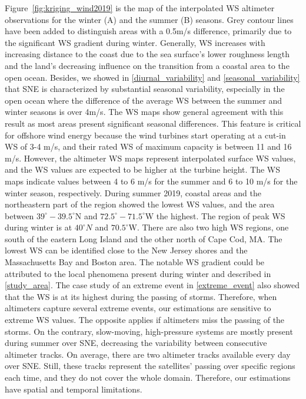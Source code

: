 Figure~\ref{fig:kriging_wind2019} is the map of the interpolated WS altimeter observations for the winter (A) and the summer (B) seasons. Grey contour lines have been added to distinguish areas with a 0.5m/s difference, primarily due to the significant WS gradient during winter. Generally, WS increases with increasing distance to the coast due to the sea surface's lower roughness length and the land's decreasing influence on the transition from a coastal area to the open ocean. Besides, we showed in \ref{diurnal_variability} and \ref{seasonal_variability} that SNE is characterized by substantial seasonal variability, especially in the open ocean where the difference of the average WS between the summer and winter seasons is over 4m/s. The WS maps show general agreement with this result as most areas present significant seasonal differences. This feature is critical for offshore wind energy because the wind turbines start operating at a cut-in WS of 3-4 m/s, and their rated WS of maximum capacity is between 11 and 16 m/s. However, the altimeter WS maps represent interpolated surface WS values, and the WS values are expected to be higher at the turbine height. The WS maps indicate values between 4 to 6 m/s for the summer and 6 to 10 m/s for the winter season, respectively. During summer 2019, coastal areas and the northeastern part of the region showed the lowest WS values, and the area between $39^{\circ}-39.5^{\circ}$N and $72.5^{\circ}-71.5^{\circ}$W the highest. The region of peak WS during winter is at $40^{\circ}N$ and $70.5^{\circ}$W. There are also two high WS regions, one south of the eastern Long Island and the other north of Cape Cod, MA. The lowest WS can be identified close to the New Jersey shores and the Massachusetts Bay and Boston area. The notable WS gradient could be attributed to the local phenomena present during winter and described in \ref{study_area}. The case study of an extreme event in \ref{extreme_event} also showed that the WS is at its highest during the passing of storms. Therefore, when altimeters capture several extreme events, our estimations are sensitive to extreme WS values. The opposite applies if altimeters miss the passing of the storms. On the contrary, slow-moving, high-pressure systems are mostly present during summer over SNE, decreasing the variability between consecutive altimeter tracks. On average, there are two altimeter tracks available every day over SNE. Still, these tracks represent the satellites' passing over specific regions each time, and they do not cover the whole domain. Therefore, our estimations have spatial and temporal limitations.

